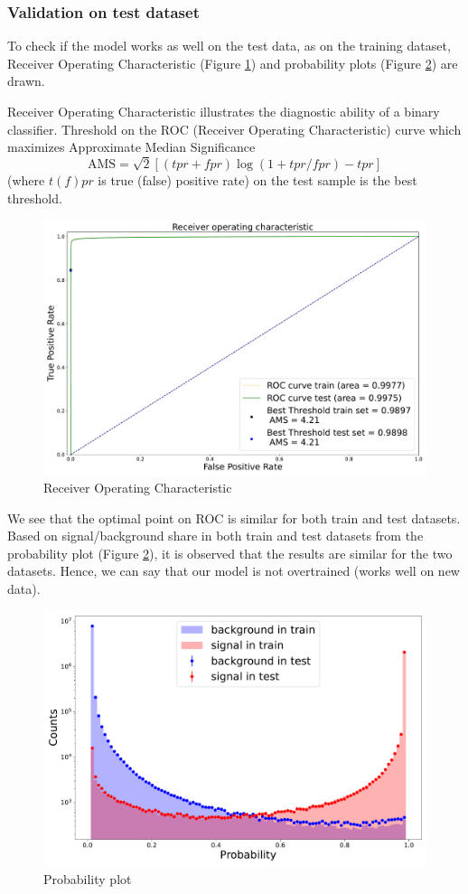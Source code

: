 \subsubsection{Validation on test dataset}
To check if the model works as well on the test data, as on the training dataset,  Receiver Operating Characteristic (Figure \ref{ROC}) and probability plots (Figure \ref{Probability plot}) are drawn.

Receiver Operating Characteristic illustrates the diagnostic ability of a binary classifier. Threshold on the ROC (Receiver Operating Characteristic) curve which maximizes Approximate Median Significance 
\begin{equation}
    \text{AMS}= \sqrt{2} [(tpr + fpr) \log(1 + tpr/fpr) - tpr]
\end{equation}
(where $t(f)pr$ is true (false) positive rate) on the test sample is the best threshold.
\begin{figure}[H]
    \centering
    \includegraphics[width=.98\textwidth]{img/ams.pdf}
    \caption{Receiver Operating Characteristic}
    \label{ROC}
\end{figure}
We see that the optimal point on ROC is similar for both train and test datasets.
Based on signal/background share in both train and test datasets from the probability plot (Figure \ref{Probability plot}), it is observed that the results are similar for the two datasets. Hence, we can say that our model is not overtrained (works well on new data).
\begin{figure}[H]
    \centering
    \includegraphics[width=.8\textwidth]{img/probability.pdf}
    \caption{Probability plot}
    \label{Probability plot}
\end{figure}

